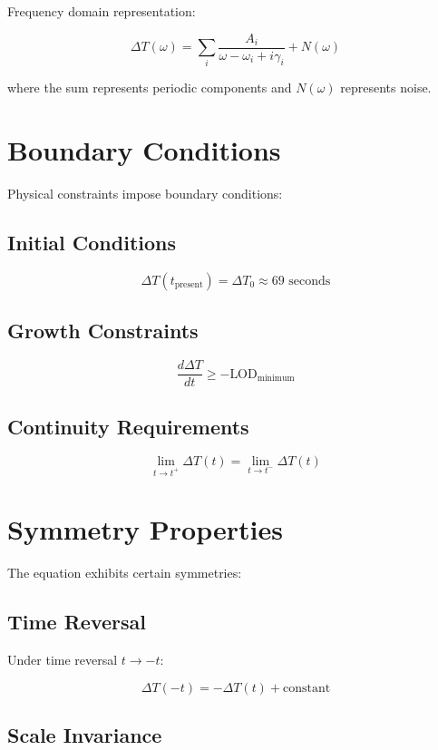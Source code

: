 \documentclass[12pt,a4paper]{report}
\begin{document}
Frequency domain representation:

\[
\Delta T(\omega) = \sum_{i} \frac{A_i}{\omega - \omega_i + i\gamma_i} + N(\omega)
\]

where the sum represents periodic components and $N(\omega)$ represents noise.

\section{Boundary Conditions}

Physical constraints impose boundary conditions:

\subsection{Initial Conditions}

\[
\Delta T(t_{\text{present}}) = \Delta T_0 \approx 69 \text{ seconds}
\]

\subsection{Growth Constraints}

\[
\frac{d\Delta T}{dt} \geq -\text{LOD}_{\text{minimum}}
\]

\subsection{Continuity Requirements}

\[
\lim_{t \to t^+} \Delta T(t) = \lim_{t \to t^-} \Delta T(t)
\]

\section{Symmetry Properties}

The equation exhibits certain symmetries:

\subsection{Time Reversal}

Under time reversal $t \to -t$:

\[
\Delta T(-t) = -\Delta T(t) + \text{constant}
\]

\subsection{Scale Invariance}
\end{document}
